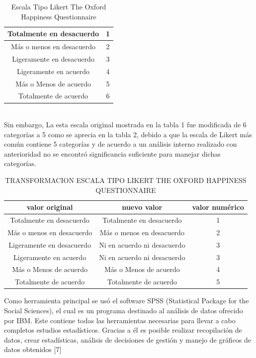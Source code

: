 \documentclass[conference]{IEEEtran}
\begin{document}
\begin{table}[h]
\caption{Escala Tipo Likert The Oxford Happiness Questionnaire}
\label{tabla 1}
\begin{center}
\begin{tabular}{|c||c|}
\hline
Totalmente en desacuerdo & 1\\ \hline
Más o menos en desacuerdo & 2\\ \hline
Ligeramente en desacuerdo & 3\\ \hline
Ligeramente en acuerdo & 4\\ \hline
Más o Menos de acuerdo & 5\\ \hline
Totalmente de acuerdo & 6\\ \hline
\end{tabular}
\end{center}
\end{table}\\
   Sin embargo, La esta escala original mostrada en la tabla 1 fue modificada de 6 categorías a 5 como se aprecia en la tabla 2, debido a que la escala de Likert más común contiene 5 categorías y de acuerdo a un análisis interno realizado con anterioridad no se encontró significancia suficiente para manejar dichas categorías.\\
   
   \begin{table}[h]
\caption{TRANSFORMACION ESCALA TIPO LIKERT THE OXFORD HAPPINESS QUESTIONNAIRE}
\label{tabla 1}
\begin{center}
\resizebox{8.8cm}{!} {
\begin{tabular}{|c||c||c|}
\hline
valor original & nuevo valor & valor numérico \\
\hline \hline \hline
Totalmente en desacuerdo & Totalmente en desacuerdo & 1\\ \hline
Más o menos en desacuerdo & Más o menos en desacuerdo & 2\\ \hline
Ligeramente en desacuerdo & Ni en acuerdo ni desacuerdo & 3\\ \hline
Ligeramente en acuerdo &Ni en acuerdo ni desacuerdo & 3\\ \hline
Más o Menos de acuerdo & Más o Menos de acuerdo & 4\\ \hline
Totalmente de acuerdo & Totalmente de acuerdo & 5\\ \hline
\end{tabular}
}
\end{center}
\end{table}
Como herramienta principal se usó el software SPSS (Statistical Package for the Social Sciences), el cual es un programa destinado al análisis de datos ofrecido por IBM. Este contiene todas las herramientas necesarias para llevar a cabo completos estudios estadísticos. Gracias a él es posible realizar recopilación de datos, crear estadísticas, análisis de decisiones de gestión y manejo de gráficos de datos obtenidos [7]\\
   
\end{document}
